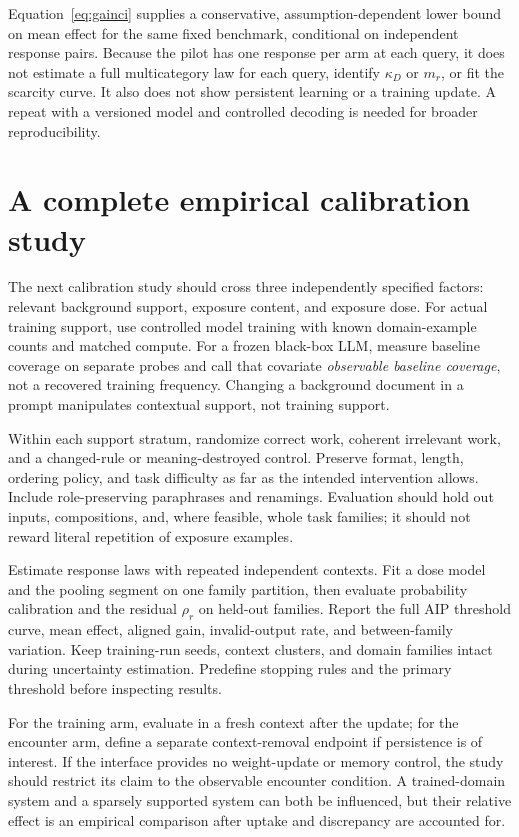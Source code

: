 \documentclass[11pt,letterpaper]{article}
\theoremstyle{definition}\newtheorem{definition}[theorem]{Definition}
\begin{document}
Equation~\eqref{eq:gainci} supplies a conservative, assumption-dependent lower bound on mean effect for the same fixed benchmark, conditional on independent response pairs. Because the pilot has one response per arm at each query, it does not estimate a full multicategory law for each query, identify $\kappa_D$ or $m_r$, or fit the scarcity curve. It also does not show persistent learning or a training update. A repeat with a versioned model and controlled decoding is needed for broader reproducibility.

\section{A complete empirical calibration study}
The next calibration study should cross three independently specified factors: relevant background support, exposure content, and exposure dose. For actual training support, use controlled model training with known domain-example counts and matched compute. For a frozen black-box LLM, measure baseline coverage on separate probes and call that covariate \emph{observable baseline coverage}, not a recovered training frequency. Changing a background document in a prompt manipulates contextual support, not training support.

Within each support stratum, randomize correct work, coherent irrelevant work, and a changed-rule or meaning-destroyed control. Preserve format, length, ordering policy, and task difficulty as far as the intended intervention allows. Include role-preserving paraphrases and renamings. Evaluation should hold out inputs, compositions, and, where feasible, whole task families; it should not reward literal repetition of exposure examples.

Estimate response laws with repeated independent contexts. Fit a dose model and the pooling segment on one family partition, then evaluate probability calibration and the residual $\rho_r$ on held-out families. Report the full AIP threshold curve, mean effect, aligned gain, invalid-output rate, and between-family variation. Keep training-run seeds, context clusters, and domain families intact during uncertainty estimation. Predefine stopping rules and the primary threshold before inspecting results.

For the training arm, evaluate in a fresh context after the update; for the encounter arm, define a separate context-removal endpoint if persistence is of interest. If the interface provides no weight-update or memory control, the study should restrict its claim to the observable encounter condition. A trained-domain system and a sparsely supported system can both be influenced, but their relative effect is an empirical comparison after uptake and discrepancy are accounted for.
\end{document}
